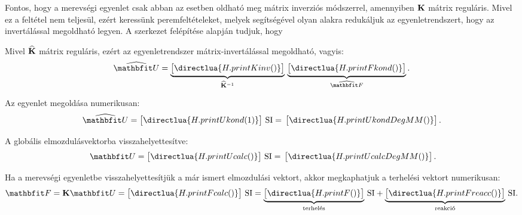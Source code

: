 Fontos, hogy a merevségi egyenlet csak abban az esetben oldható meg mátrix
inverziós módszerrel, amennyiben $\mathbf{K}$ mátrix reguláris. Mivel ez a
feltétel nem teljesül, ezért keressünk peremfeltételeket, melyek segítségével
olyan alakra redukáljuk az egyenletrendszert, hogy az invertálással megoldható
legyen. A szerkezet felépítése alapján tudjuk, hogy
%

%
Mivel $\widehat{\mathbf{K}}$ mátrix reguláris, ezért az egyenletrendszer
mátrix-invertálással megoldható, vagyis:
\begin{equation}
  \sifigures{3} \sisci{}
  \widehat{\rvec U} =
  \underbrace{\begin{bmatrix}
      \directlua{H.printKinv()}
    \end{bmatrix}}_{\widehat{\rmat K}^{-1}}
  \siplaces{2} \sifix{}
  \underbrace{\begin{bmatrix}
      \directlua{H.printFkond()}
    \end{bmatrix}}_{\widehat{\rvec F}}
  .
  \label{eq:inverted}
\end{equation}

Az egyenlet megoldása numerikusan:
\begin{equation}
  \sifigures{4} \sisci{}
  \widehat{\rvec U} = \begin{bmatrix}
    \directlua{H.printUkond(1)}
  \end{bmatrix} \, \mathrm{SI}
  =
  \siplaces{4} \sifix{}
  \begin{bmatrix}
    \directlua{H.printUkondDegMM()}
  \end{bmatrix}
  \text.
  \label{eq:numericCond}
\end{equation}

A globális elmozdulásvektorba visszahelyettesítve:
\begin{equation}
  \sifigures{3} \sisci\
  {\rvec U} = \begin{bmatrix}
    \directlua{H.printUcalc()}
  \end{bmatrix} \, \mathrm{SI}
  =
  \siplaces{4} \sifix{}
  \begin{bmatrix}
    \directlua{H.printUcalcDegMM()}
  \end{bmatrix}
  \text.
\end{equation}

Ha a merevségi egyenletbe visszahelyettesítjük a már ismert elmozdulási vektort,
akkor megkaphatjuk a terhelési vektort numerikusan:
\begin{equation}
  \siplaces{3}
  \rvec F = \rmat K \rvec U =
  \begin{bmatrix}
    \directlua{H.printFcalc()}
  \end{bmatrix}
  \, \mathrm{SI}
  =
  \underbrace{\begin{bmatrix}
      \directlua{H.printF()}
    \end{bmatrix}}_\text{terhelés}
  \, \mathrm{SI}
  +
  \underbrace{\begin{bmatrix}
      \directlua{H.printFreacc()}
    \end{bmatrix}}_\text{reakció}
  \, \mathrm{SI}
  \text.
  \label{eq:Fcalc}
\end{equation}


